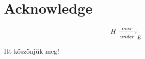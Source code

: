 \chapter{Acknowledge}
\label{chap:acknowledge}

\[
 H \xrightharpoondown[under]{over}_E
\]


Itt köszönjük meg!